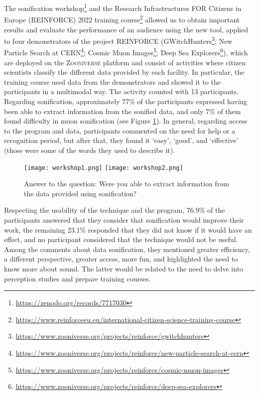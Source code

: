 \documentclass[baaa]{baaa}
\begin{document}
The {sonification workshop}\footnote[4]{\url{https://zenodo.org/records/7717030}} and the {Research Infrastructures FOR Citizens in Europe (REINFORCE) 2022 training course}\footnote[5]{\url{https://www.reinforceeu.eu/international-citizen-science-training-course}} allowed us to obtain important results and evaluate the performance of an audience using the new tool, applied to four demonstrators of the project REINFORCE ({GWitchHunters}\footnote[1]{\url{https://www.zooniverse.org/projects/reinforce/gwitchhunters}}; {New Particle Search at CERN}\footnote[2]{\url{https://www.zooniverse.org/projects/reinforce/new-particle-search-at-cern}}; {Cosmic Muon Images}\footnote[3]{\url{https://www.zooniverse.org/projects/reinforce/cosmic-muon-images}}; {Deep Sea Explorers}\footnote[4]{\url{https://www.zooniverse.org/projects/reinforce/deep-sea-explorers}}), which are deployed on the \textsc{Zooniverse} platform and consist of activities where citizen scientists classify the different data provided by each facility. In particular, the training course used data from the demonstrators and showed it to the participants in a multimodal way. The activity counted with 13 participants. Regarding sonification, approximately 77\% of the participants expressed having been able to extract information from the sonified data, and only 7\% of them found difficulty in muon sonification (see Figure \ref{fig:workshop}). In general, regarding access to the program and data, participants commented on the need for help or a recognition period, but after that, they found it `easy', `good', and `effective' (those were some of the words they used to describe it).

\begin{figure}[!t]
\centering
    \texttt{[image: workshop1.png]}
    \texttt{[image: workshop2.png]}
    \caption{Answer to the question: Were you able to extract information from the data provided using sonification?}
    \label{fig:workshop}
\end{figure}

Respecting the usability of the technique and the program, 76.9\% of the participants answered that they consider that sonification would improve their work, the remaining 23.1\% responded that they did not know if it would have an effect, and no participant considered that the technique would not be useful. Among the comments about data sonification, they mentioned greater efficiency, a different perspective, greater access, more fun, and highlighted the need to know more about sound. The latter would be related to the need to delve into perception studies and prepare training courses.
\end{document}
